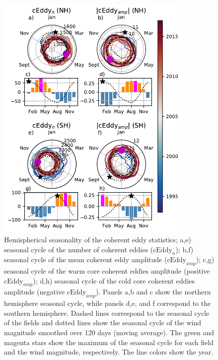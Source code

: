 \documentclass[draft,linenumbers]{agujournal2019}
\newcommand{\cEddy}{\textrm{cEddy}}
\begin{document}
	\begin{figure}
	    \centering
	    \includegraphics[width=95mm]{figures/All_polar_plots_eddy_stats_polarity_V3.pdf}
	    \caption{Hemispherical seasonality of the coherent eddy statistics;
		a,e) seasonal cycle of the number of coherent eddies ($\cEddy_n$); b,f) seasonal cycle of the mean coherent eddy amplitude ($\cEddy_{amp}$); c,g) seasonal cycle of the warm core coherent eddies amplitude (positive $\cEddy_{amp}$); d,h) seasonal cycle of the cold core coherent eddies amplitude (negative $\cEddy_{amp}$). Panels a,b and c show the northern hemisphere seasonal cycle, while panels d,e, and f correspond to the southern hemisphere. Dashed lines correspond to the seasonal cycle of the fields and dotted lines show the seasonal cycle of the wind magnitude smoothed over 120 days (moving average). The green and magenta stars show the maximum of the seasonal cycle for each field and the wind magnitude, respectively. The line colors show the year.}
	    \label{fig:eddy_stats}
	\end{figure}
\end{document}
